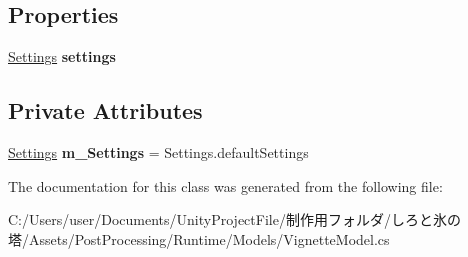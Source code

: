 \subsection*{Properties}
\begin{DoxyCompactItemize}
\item 
\mbox{\label{class_unity_engine_1_1_post_processing_1_1_vignette_model_a9bf7faa890c766df24f80fb30f62e761}} 
\hyperlink{struct_unity_engine_1_1_post_processing_1_1_vignette_model_1_1_settings}{Settings} {\bfseries settings}
\end{DoxyCompactItemize}
\subsection*{Private Attributes}
\begin{DoxyCompactItemize}
\item 
\mbox{\label{class_unity_engine_1_1_post_processing_1_1_vignette_model_af91392c1733c1ce4465dcad41ffa306e}} 
\hyperlink{struct_unity_engine_1_1_post_processing_1_1_vignette_model_1_1_settings}{Settings} {\bfseries m\+\_\+\+Settings} = Settings.\+default\+Settings
\end{DoxyCompactItemize}


The documentation for this class was generated from the following file\+:\begin{DoxyCompactItemize}
\item 
C\+:/\+Users/user/\+Documents/\+Unity\+Project\+File/制作用フォルダ/しろと氷の塔/\+Assets/\+Post\+Processing/\+Runtime/\+Models/Vignette\+Model.\+cs\end{DoxyCompactItemize}
